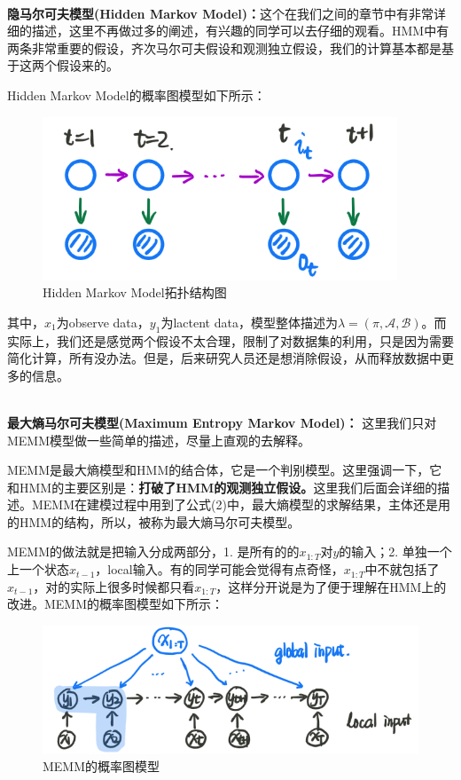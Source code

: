 \documentclass[a4paper]{article}
\begin{document}
~\\
\textbf{隐马尔可夫模型(Hidden Markov Model)：}这个在我们之间的章节中有非常详细的描述，这里不再做过多的阐述，有兴趣的同学可以去仔细的观看。HMM中有两条非常重要的假设，齐次马尔可夫假设和观测独立假设，我们的计算基本都是基于这两个假设来的。

Hidden Markov Model的概率图模型如下所示：
\begin{figure}[H]
    \centering
    \includegraphics[width=.45\textwidth]{微信图片_20200107213811.png}
    \caption{Hidden Markov Model拓扑结构图}
    \label{fig:my_label_1}
\end{figure}
其中，$x_1$为observe data，$y_1$为lactent data，模型整体描述为$\lambda = (\pi,\mathcal{A},\mathcal{B})$。而实际上，我们还是感觉两个假设不太合理，限制了对数据集的利用，只是因为需要简化计算，所有没办法。但是，后来研究人员还是想消除假设，从而释放数据中更多的信息。

~\\
\textbf{最大熵马尔可夫模型(Maximum Entropy Markov Model)：}
这里我们只对MEMM模型做一些简单的描述，尽量上直观的去解释。

MEMM是最大熵模型和HMM的结合体，它是一个判别模型。这里强调一下，它和HMM的主要区别是：\textbf{打破了HMM的观测独立假设。}这里我们后面会详细的描述。MEMM在建模过程中用到了公式(2)中，最大熵模型的求解结果，主体还是用的HMM的结构，所以，被称为最大熵马尔可夫模型。

MEMM的做法就是把输入分成两部分，1. 是所有的的$x_{1:T}$对$y$的输入；2. 单独一个上一个状态$x_{t-1}$，local输入。有的同学可能会觉得有点奇怪，$x_{1:T}$中不就包括了$x_{t-1}$，对的实际上很多时候都只看$x_{1:T}$，这样分开说是为了便于理解在HMM上的改进。MEMM的概率图模型如下所示：
\begin{figure}[H]
    \centering
    \includegraphics[width=.65\textwidth]{微信图片_20200221182717.png}
    \caption{MEMM的概率图模型}
    \label{fig:my_label_1}
\end{figure}
\end{document}
